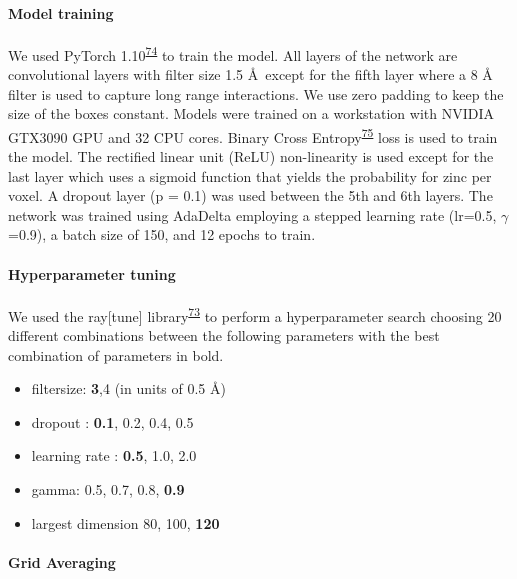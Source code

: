 \documentclass[ lineno,
  9pt]{elife}
\providecommand{\tightlist}{%
  \setlength{\itemsep}{0pt}\setlength{\parskip}{0pt}}
\begin{document}
\hypertarget{model-training}{%
\paragraph{Model training}\label{model-training}}

We used PyTorch 1.10\textsuperscript{\protect\hyperlink{ref-iOWq2JB8}{74}} to train the model. All layers of the network are convolutional layers with filter size 1.5 \AA\, except for the fifth layer where a 8 \AA\, filter is used to capture long range interactions. We use zero padding to keep the size of the boxes constant. Models were trained on a workstation with NVIDIA GTX3090 GPU and 32 CPU cores. Binary Cross Entropy\textsuperscript{\protect\hyperlink{ref-hchMCnC1}{75}} loss is used to train the model. The rectified linear unit (ReLU) non-linearity is used except for the last layer which uses a sigmoid function that yields the probability for zinc per voxel. A dropout layer (p = 0.1) was used between the 5th and 6th layers. The network was trained using AdaDelta employing a stepped learning rate (lr=0.5, $\gamma$=0.9), a batch size of 150, and 12 epochs to train.

\hypertarget{hyperparameter-tuning}{%
\paragraph{Hyperparameter tuning}\label{hyperparameter-tuning}}

We used the ray{[}tune{]} library\textsuperscript{\protect\hyperlink{ref-19MS2ZVR1}{73}} to perform a hyperparameter search choosing 20 different combinations between the following parameters with the best combination of parameters in bold. 

\begin{itemize}
\tightlist
\item
  filtersize: \textbf{3},4 (in units of 0.5 \AA )
\item
  dropout : \textbf{0.1}, 0.2, 0.4, 0.5
\item
  learning rate : \textbf{0.5}, 1.0, 2.0
\item
  gamma: 0.5, 0.7, 0.8, \textbf{0.9}
\item
  largest dimension 80, 100, \textbf{120}
\end{itemize}

\hypertarget{grid-averaging}{%
\paragraph{Grid Averaging}\label{grid-averaging}}
\end{document}
